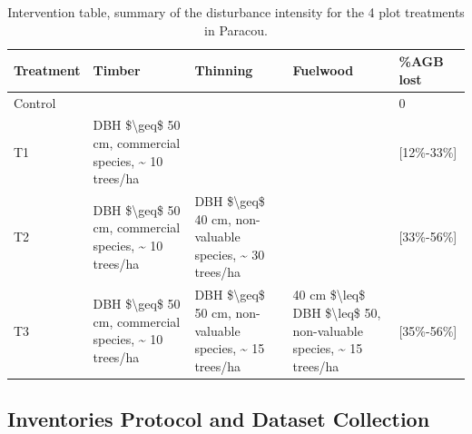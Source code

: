 \documentclass[fleqn,10pt]{ArtEcoFoG} %
\begin{document}
\begin{longtabu} to 
\caption{\label{tab:Tab1}Intervention table, summary of the disturbance intensity for the 4 plot treatments in Paracou.}\\
\toprule
Treatment & Timber & Thinning & Fuelwood & \%AGB lost\\
\midrule
Control &  &  &  & 0\\
T1 & DBH \$\textbackslash{}geq\$ 50 cm, commercial species, \textasciitilde{} 10 trees/ha &  &  & [12\%-33\%]\\
T2 & DBH \$\textbackslash{}geq\$ 50 cm, commercial species, \textasciitilde{} 10 trees/ha & DBH \$\textbackslash{}geq\$ 40 cm, non-valuable species, \textasciitilde{} 30 trees/ha &  & [33\%-56\%]\\
T3 & DBH \$\textbackslash{}geq\$ 50 cm, commercial species, \textasciitilde{} 10 trees/ha & DBH \$\textbackslash{}geq\$ 50 cm, non-valuable species, \textasciitilde{} 15 trees/ha & 40 cm \$\textbackslash{}leq\$ DBH \$\textbackslash{}leq\$ 50, non-valuable species, \textasciitilde{} 15 trees/ha & [35\%-56\%]\\
\bottomrule
\end{longtabu}

\subsection{Inventories Protocol and Dataset
Collection}\label{inventories-protocol-and-dataset-collection}
\end{document}
